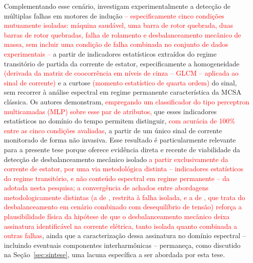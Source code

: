 \documentclass[times,final]{elsarticle}
\begin{document}
Complementando esse cenário, \citet{martinez2022} investigam experimentalmente a detecção de múltiplas falhas em motores de indução \textcolor{red}{-- especificamente cinco condições mutuamente isoladas: máquina saudável, uma barra de rotor quebrada, duas barras de rotor quebradas, falha de rolamento e desbalanceamento mecânico de massa, sem incluir uma condição de falha combinada no conjunto de dados experimentais --} a partir de indicadores estatísticos extraídos do regime transitório de partida da corrente de estator, especificamente a homogeneidade \textcolor{red}{(derivada da matriz de coocorrência em níveis de cinza -- GLCM -- aplicada ao sinal de corrente)} e a curtose \textcolor{red}{(momento estatístico de quarta ordem)} do sinal, sem recorrer à análise espectral em regime permanente característica da MCSA clássica. Os autores demonstram, \textcolor{red}{empregando um classificador do tipo perceptron multicamadas (MLP) sobre esse par de atributos,} que esses indicadores estatísticos no domínio do tempo permitem distinguir, \textcolor{red}{com acurácia de 100\% entre as cinco condições avaliadas}, a partir de um único sinal de corrente monitorado de forma não invasiva. Esse resultado é particularmente relevante para a presente tese porque oferece evidência direta e recente de viabilidade da detecção de desbalanceamento mecânico isolado \textcolor{red}{a partir exclusivamente da corrente de estator, por uma via metodológica distinta -- indicadores estatísticos do regime transitório, e não conteúdo espectral em regime permanente -- da adotada nesta pesquisa; a convergência de achados entre abordagens metodologicamente distintas (a de \citet{martinez2022}, restrita à falha isolada, e a de \citet{benamira2022}, que trata do desbalanceamento em cenário combinado com desequilíbrio de tensão) reforça a plausibilidade física da hipótese de que o desbalanceamento mecânico deixa assinatura identificável na corrente elétrica, tanto isolada quanto combinada a outras falhas}, ainda que a caracterização dessa assinatura no domínio espectral -- incluindo eventuais componentes interharmônicas -- permaneça, como discutido na Seção~\ref{sec:sintese}, uma lacuna específica a ser abordada por esta tese.
\end{document}
